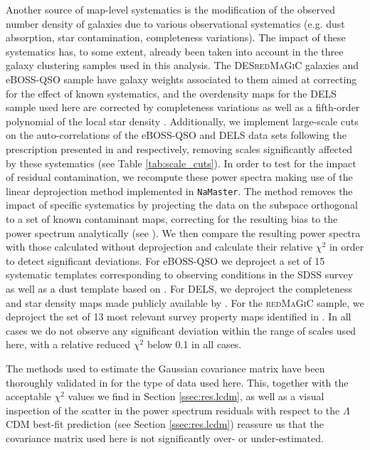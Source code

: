 \documentclass[a4paper,11pt]{article}
\newcommand{\lcdm}{$\Lambda$CDM\xspace}
\newcommand{\nmt}{\texttt{NaMaster}\xspace}
\newcommand{\des}{DES\xspace}
\newcommand{\eboss}{eBOSS-QSO\xspace}
\newcommand{\redmagic}{\textsc{redMaGiC}\xspace}
\newcommand{\dls}{DELS\xspace}
\begin{document}
      Another source of map-level systematics is the modification of the observed number density of galaxies due to various observational systematics (e.g. dust absorption, star contamination, completeness variations). The impact of these systematics has, to some extent, already been taken into account in the three galaxy clustering samples used in this analysis. The \des \redmagic galaxies and \eboss sample have galaxy weights associated to them aimed at correcting for the effect of known systematics, and the overdensity maps for the \dls sample used here are corrected by completeness variations as well as a fifth-order polynomial of the local star density \cite{2010.00466}. Additionally, we implement large-scale cuts on the auto-correlations of the \eboss and \dls data sets following the prescription presented in \cite{2007.08999} and \cite{2010.00466} respectively, removing scales significantly affected by these systematics (see Table \ref{tab:scale_cuts}). In order to test for the impact of residual contamination, we recompute these power spectra making use of the linear deprojection method implemented in \nmt. The method removes the impact of specific systematics by projecting the data on the subspace orthogonal to a set of known contaminant maps, correcting for the resulting bias to the power spectrum analytically (see \cite{1609.03577,1809.09603}). We then compare the resulting power spectra with those calculated without deprojection and calculate their relative $\chi^2$ in order to detect significant deviations. For \eboss we deproject a set of 15 systematic templates corresponding to observing conditions in the SDSS survey as well as a dust template based on \cite{astro-ph/9710327}. For \dls, we deproject the completeness and star density maps made publicly available by \cite{2010.00466}. For the \redmagic sample, we deproject the set of 13 most relevant survey property maps identified in \cite{1708.01536}. In all cases we do not observe any significant deviation within the range of scales used here, with a relative reduced $\chi^2$ below 0.1 in all cases.

      The methods used to estimate the Gaussian covariance matrix have been thoroughly validated in \cite{1906.11765,2010.09717} for the type of data used here. This, together with the acceptable $\chi^2$ values we find in Section \ref{ssec:res.lcdm}, as well as a visual inspection of the scatter in the power spectrum residuals with respect to the \lcdm best-fit prediction (see Section \ref{ssec:res.lcdm}) reassure us that the covariance matrix used here is not significantly over- or under-estimated.
\end{document}
